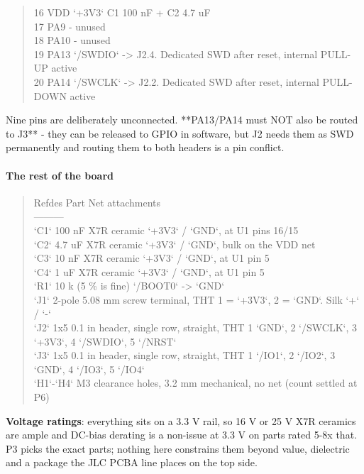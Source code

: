 \documentclass[11pt,a4paper]{article}
\begin{document}
\begin{quote}
\textbar{} 16 \textbar{} VDD \textbar{} `+3V3` \textbar{} C1 100 nF + C2 4.7 uF \textbar{}\\
\textbar{} 17 \textbar{} PA9 \textbar{} - \textbar{} unused \textbar{}\\
\textbar{} 18 \textbar{} PA10 \textbar{} - \textbar{} unused \textbar{}\\
\textbar{} 19 \textbar{} PA13 \textbar{} `/SWDIO` \textbar{} -\textgreater{} J2.4. Dedicated SWD after reset, internal PULL-UP active \textbar{}\\
\textbar{} 20 \textbar{} PA14 \textbar{} `/SWCLK` \textbar{} -\textgreater{} J2.2. Dedicated SWD after reset, internal PULL-DOWN active \textbar{}
\end{quote}
Nine pins are deliberately unconnected. {*}{*}PA13/PA14 must NOT also be routed to J3{*}{*} - they can be released to GPIO in software, but J2 needs them as SWD permanently and routing them to both headers is a pin conflict.

\paragraph*{The rest of the board}
\begin{quote}\small\ttfamily\raggedright
\textbar{} Refdes \textbar{} Part \textbar{} Net attachments \textbar{}\\
\textbar{}---\textbar{}---\textbar{}---\textbar{}\\
\textbar{} `C1` \textbar{} 100 nF X7R ceramic \textbar{} `+3V3` / `GND`, at U1 pins 16/15 \textbar{}\\
\textbar{} `C2` \textbar{} 4.7 uF X7R ceramic \textbar{} `+3V3` / `GND`, bulk on the VDD net \textbar{}\\
\textbar{} `C3` \textbar{} 10 nF X7R ceramic \textbar{} `+3V3` / `GND`, at U1 pin 5 \textbar{}\\
\textbar{} `C4` \textbar{} 1 uF X7R ceramic \textbar{} `+3V3` / `GND`, at U1 pin 5 \textbar{}\\
\textbar{} `R1` \textbar{} 10 k (5 \% is fine) \textbar{} `/BOOT0` -\textgreater{} `GND` \textbar{}\\
\textbar{} `J1` \textbar{} 2-pole 5.08 mm screw terminal, THT \textbar{} 1 = `+3V3`, 2 = `GND`. Silk `+` / `-` \textbar{}\\
\textbar{} `J2` \textbar{} 1x5 0.1 in header, single row, straight, THT \textbar{} 1 `GND`, 2 `/SWCLK`, 3 `+3V3`, 4 `/SWDIO`, 5 `/NRST` \textbar{}\\
\textbar{} `J3` \textbar{} 1x5 0.1 in header, single row, straight, THT \textbar{} 1 `/IO1`, 2 `/IO2`, 3 `GND`, 4 `/IO3`, 5 `/IO4` \textbar{}\\
\textbar{} `H1`-`H4` \textbar{} M3 clearance holes, 3.2 mm \textbar{} mechanical, no net (count settled at P6) \textbar{}
\end{quote}
\textbf{Voltage ratings}: everything sits on a 3.3 V rail, so 16 V or 25 V X7R ceramics are ample and DC-bias derating is a non-issue at 3.3 V on parts rated 5-8x that. P3 picks the exact parts; nothing here constrains them beyond value, dielectric and a package the JLC PCBA line places on the top side.
\end{document}
